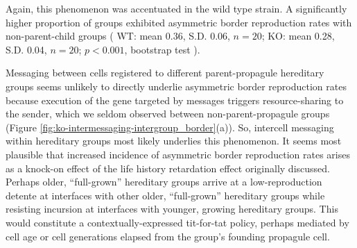 Again, this phenomenon was accentuated in the wild type strain.
A significantly higher proportion of groups exhibited asymmetric border reproduction rates with non-parent-child groups
(%
WT: mean 0.36, S.D. 0.06, $n=20$;
KO: mean 0.28, S.D. 0.04, $n=20$;
$p < 0.001$, bootstrap test%
). %

Messaging between cells registered to different parent-propagule hereditary groups seems unlikely to directly underlie asymmetric border reproduction rates because execution of the gene targeted by messages triggers resource-sharing to the sender, which we seldom observed between non-parent-propagule groups (Figure \ref{fig:ko-intermessaging-intergroup_border}(a)).
So, intercell messaging within hereditary groups most likely underlies this phenomenon.
It seems most plausible that increased incidence of asymmetric border reproduction rates arises as a knock-on effect of the life history retardation effect originally discussed.
Perhaps older, ``full-grown'' hereditary groups arrive at a low-reproduction detente at interfaces with other older, ``full-grown'' hereditary groups while resisting incursion at interfaces with younger, growing hereditary groups.
This would constitute a contextually-expressed tit-for-tat policy, perhaps mediated by cell age or cell generations elapsed from the group's founding propagule cell.
